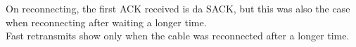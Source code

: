 On reconnecting, the first ACK received is da SACK, but this was also the case when reconnecting after waiting a longer time.\\
Fast retransmits show only when the cable was reconnected after a longer time.